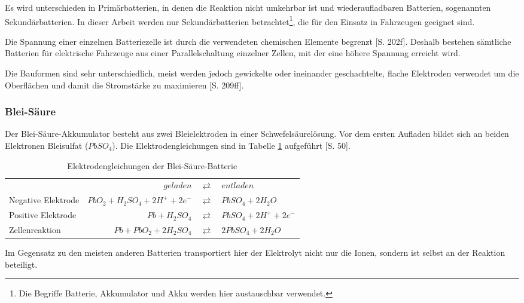 Es wird unterschieden in Primärbatterien, in denen die Reaktion nicht umkehrbar ist und wiederaufladbaren Batterien, sogenannten Sekundärbatterien. In dieser Arbeit werden nur Sekundärbatterien betrachtet\footnote{Die Begriffe Batterie, Akkumulator und Akku werden hier austauschbar verwendet.}, die für den Einsatz in Fahrzeugen geeignet sind.

Die Spannung einer einzelnen Batteriezelle ist durch die verwendeten chemischen Elemente begrenzt \cite{Sterner:2014}[S. 202f]. Deshalb bestehen sämtliche Batterien für elektrische Fahrzeuge aus einer Parallelschaltung einzelner Zellen, mit der eine höhere Spannung erreicht wird.

Die Bauformen sind sehr unterschiedlich, meist werden jedoch gewickelte oder ineinander geschachtelte, flache Elektroden verwendet um die Oberflächen und damit die Stromstärke zu maximieren \cite{Sterner:2014}[S. 209ff].

\subsubsection{Blei-Säure}
Der Blei-Säure-Akkumulator besteht aus zwei Bleielektroden in einer Schwefelsäurelösung. Vor dem ersten Aufladen bildet sich an beiden Elektronen Bleisulfat ($PbSO_4$). Die Elektrodengleichungen sind in Tabelle \ref{Pb} aufgeführt \cite{KiehneBattery}[S. 50].

\begin{table}\centering
	\begin{tabularx}{\linewidth}{XrcX}
		&                       $geladen$ & $\rightleftarrows$ & $entladen$             \\
		Negative Elektrode & $PbO_2 + H_2SO_4 + 2H^+ + 2e^-$ & $\rightleftarrows$ & $PbSO_4 + 2H_2O$       \\
		Positive Elektrode &                  $Pb + H_2SO_4$ & $\rightleftarrows$ & $PbSO_4 + 2H^+ + 2e^-$ \\ \midrule
		Zellenreaktion     &         $Pb + PbO_2 + 2H_2SO_4$ & $\rightleftarrows$ & $2PbSO_4 + 2H_2O$      \\
	\end{tabularx}
	\caption{Elektrodengleichungen der Blei-Säure-Batterie}
	\label{Pb}
\end{table}


Im Gegensatz zu den meisten anderen Batterien transportiert hier der Elektrolyt nicht nur die Ionen, sondern ist selbst an der Reaktion beteiligt.


